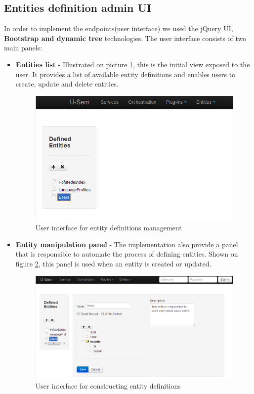 \subsection{Entities definition admin UI}
In order to implement the endpoints(user interface) we used the jQuery UI, \textbf{Bootstrap and dynamic tree} technologies. The user interface consists of two main panels:
	\begin{itemize}
	
		\item \textbf{Entities list} - Illustrated on picture \ref{fig:storageEntityList}, this is the initial view exposed to the user. It provides a list of available entity definitions and enables users to create, update and delete entities.
		
\begin{figure}[h!]
  \centering
  	\includegraphics[scale=0.5]{storage/ui/entityList.png}
  \caption{User interface for entity definitions management}
  \label{fig:storageEntityList}
\end{figure}
		
		\item \textbf{Entity manipulation panel} - The implementation also provide a panel that is responsible to automate the process of defining entities. Shown on figure \ref{fig:storageEntityPanel}, this panel is used when an entity is created or updated.
		
\begin{figure}[h!]
  \centering
  	\includegraphics[scale=0.5]{storage/ui/entityPanel.png}
  \caption{User interface for constructing entity definitions}
  \label{fig:storageEntityPanel}
\end{figure}

	\end{itemize}


